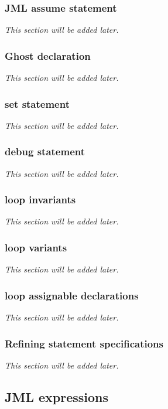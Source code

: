 \subsubsection{JML assume statement}
\textit{This section will be added later.} %

\subsubsection{Ghost declaration}
\textit{This section will be added later.} %

\subsubsection{set statement}
\textit{This section will be added later.} %


\subsubsection{debug statement}
\textit{This section will be added later.} %


\subsubsection{loop invariants}
\textit{This section will be added later.} %

\subsubsection{loop variants}
\textit{This section will be added later.} %

\subsubsection{loop assignable declarations}
\textit{This section will be added later.} %


\subsubsection{Refining statement specifications}
\textit{This section will be added later.} %

\subsection{JML expressions}

